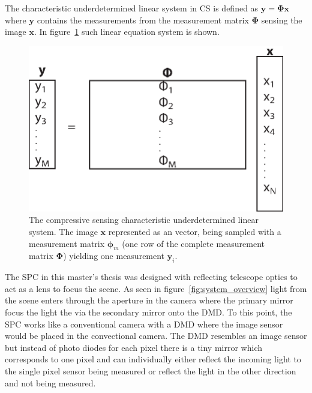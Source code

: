 The characteristic  underdetermined linear system in CS is defined as $ \mathbf{y} = \mathbf{\Phi}\mathbf{x}$ where $\mathbf{y}$ contains the measurements from the measurement matrix $\mathbf{\Phi}$ sensing the image $\mathbf{x}$. In figure~\ref{fig:CS_eq_sys} such linear equation system is shown.

\begin{figure}[H]
	\includegraphics[scale=0.5]{gfx/CS_eq.eps}
	\caption{The compressive sensing characteristic underdetermined linear system. The image $\mathbf{x}$ represented as an vector, being sampled with a measurement matrix $\mathbf{\phi}_m$ (one row of the complete measurement matrix $\mathbf{\Phi}$) yielding one measurement $\mathbf{y}_i$.}
	\label{fig:CS_eq_sys}
\end{figure}

The SPC in this master's thesis was designed with reflecting telescope optics to act as a lens to focus the scene. As seen in figure~\ref{fig:system_overview} light from the scene enters through the aperture in the camera where the primary mirror focus the light the via the secondary mirror onto the DMD. To this point, the SPC works like a conventional camera with a DMD where the image sensor would be placed in the convectional camera. The DMD resembles an image sensor but instead of photo diodes for each pixel there is a tiny mirror which corresponds to one pixel and can individually either reflect the incoming light to the single pixel sensor being measured or reflect the light in the other direction and not being measured.




